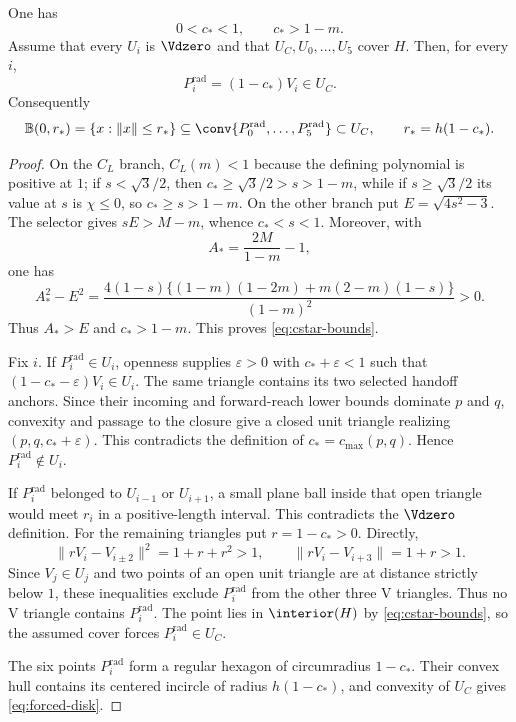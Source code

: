 \begin{lemma}
\label{lem:symmetric-core-witness}
One has
\begin{equation}
 0<c_*<1,\qquad c_*>1-m.                         \label{eq:cstar-bounds}
\end{equation}
Assume that every $U_i$ is $\Vdzero$ and that
$U_C,U_0,\ldots,U_5$ cover $H$.  Then, for every $i$,
\[
 P_i^{\mathrm{rad}}=(1-c_*)V_i\in U_C.
\]
Consequently
\begin{equation}
 \mathbb B(0,r_*)=\{x:\lVert x\rVert\le r_*\}
 \subseteq\conv\{P_0^{\mathrm{rad}},\ldots,P_5^{\mathrm{rad}}\}
 \subset U_C,
 \qquad r_*=h(1-c_*).                           \label{eq:forced-disk}
\end{equation}
\end{lemma}

\begin{proof}
On the $C_L$ branch, $C_L(m)<1$ because the defining polynomial is positive
at $1$; if $s<\sqrt3/2$, then $c_*\ge\sqrt3/2>s>1-m$, while if
$s\ge\sqrt3/2$ its value at $s$ is $\chi\le0$, so $c_*\ge s>1-m$.
On the other branch put $E=\sqrt{4s^2-3}$.  The selector gives
$sE>M-m$, whence $c_*<s<1$.  Moreover, with
\[
 A_*=\frac{2M}{1-m}-1,
\]
one has
\[
 A_*^2-E^2=
 \frac{4(1-s)\{(1-m)(1-2m)+m(2-m)(1-s)\}}{(1-m)^2}>0.
\]
Thus $A_*>E$ and $c_*>1-m$.  This proves
\eqref{eq:cstar-bounds}.

Fix $i$.  If $P_i^{\mathrm{rad}}\in U_i$, openness supplies $\varepsilon>0$ with
$c_*+\varepsilon<1$ such that
$(1-c_*-\varepsilon)V_i\in U_i$.  The same triangle contains its two selected
handoff anchors.  Since their incoming and forward-reach lower bounds dominate $p$ and
$q$, convexity and passage to the closure give a closed unit triangle
realizing $(p,q,c_*+\varepsilon)$.  This contradicts the definition of
$c_*=c_{\max}(p,q)$.  Hence $P_i^{\mathrm{rad}}\notin U_i$.

If $P_i^{\mathrm{rad}}$ belonged to $U_{i-1}$ or $U_{i+1}$, a small plane
ball inside that
open triangle would meet $r_i$ in a positive-length
interval.  This contradicts the $\Vdzero$ definition.  For the remaining
triangles put $r=1-c_*>0$.  Directly,
\[
 \lVert rV_i-V_{i\pm2}\rVert^2=1+r+r^2>1,
 \qquad
 \lVert rV_i-V_{i+3}\rVert=1+r>1.
\]
Since $V_j\in U_j$ and two points of an open unit triangle are at distance
strictly below $1$, these inequalities exclude $P_i^{\mathrm{rad}}$ from the
other three V triangles.  Thus no V triangle contains
$P_i^{\mathrm{rad}}$.  The point lies in
$\interior(H)$ by \eqref{eq:cstar-bounds}, so the assumed cover forces
$P_i^{\mathrm{rad}}\in U_C$.

The six points $P_i^{\mathrm{rad}}$ form a regular hexagon of circumradius
$1-c_*$.  Their
convex hull contains its centered incircle of radius $h(1-c_*)$, and convexity
of $U_C$ gives \eqref{eq:forced-disk}.
\end{proof}

